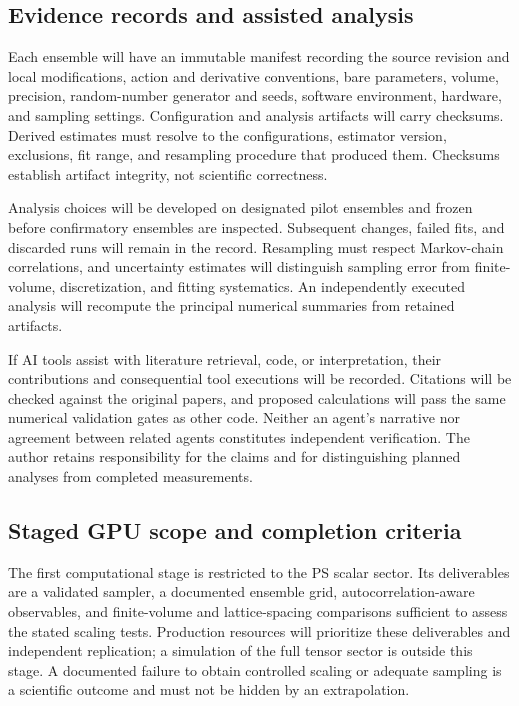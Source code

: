 \subsection{Evidence records and assisted analysis}
\label{sec:evidence-records}

Each ensemble will have an immutable manifest recording the source revision and local modifications, action and derivative conventions, bare parameters, volume, precision, random-number generator and seeds, software environment, hardware, and sampling settings.  Configuration and analysis artifacts will carry checksums.  Derived estimates must resolve to the configurations, estimator version, exclusions, fit range, and resampling procedure that produced them.  Checksums establish artifact integrity, not scientific correctness.

Analysis choices will be developed on designated pilot ensembles and frozen before confirmatory ensembles are inspected.  Subsequent changes, failed fits, and discarded runs will remain in the record.  Resampling must respect Markov-chain correlations, and uncertainty estimates will distinguish sampling error from finite-volume, discretization, and fitting systematics.  An independently executed analysis will recompute the principal numerical summaries from retained artifacts.

If AI tools assist with literature retrieval, code, or interpretation, their contributions and consequential tool executions will be recorded.  Citations will be checked against the original papers, and proposed calculations will pass the same numerical validation gates as other code.  Neither an agent's narrative nor agreement between related agents constitutes independent verification.  The author retains responsibility for the claims and for distinguishing planned analyses from completed measurements.


\subsection{Staged GPU scope and completion criteria}
\label{sec:gpu-scope}

The first computational stage is restricted to the PS scalar sector.  Its deliverables are a validated sampler, a documented ensemble grid, autocorrelation-aware observables, and finite-volume and lattice-spacing comparisons sufficient to assess the stated scaling tests.  Production resources will prioritize these deliverables and independent replication; a simulation of the full tensor sector is outside this stage.  A documented failure to obtain controlled scaling or adequate sampling is a scientific outcome and must not be hidden by an extrapolation.

